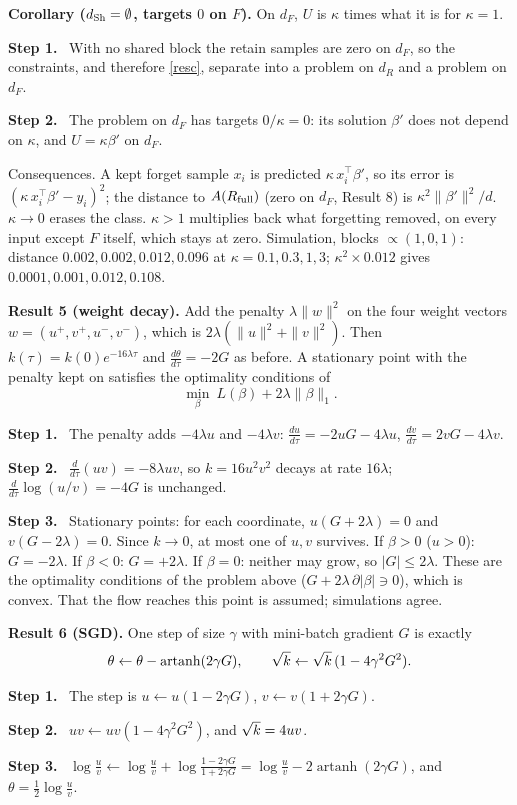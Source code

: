 \documentclass[10pt]{article}
\newcommand{\Rf}{R_{\rm full}}\newcommand{\Ff}{F_{\rm full}}\newcommand{\dSh}{d_{\rm Sh}}
\newcommand{\step}[1]{\par\smallskip\textbf{Step #1.}\ }
\begin{document}
\textbf{Corollary ($\dSh=\emptyset$, targets $0$ on $F$).} On $d_F$, $U$ is $\kappa$ times what it is for $\kappa=1$.
\step1 With no shared block the retain samples are zero on $d_F$, so the constraints, and therefore \eqref{resc}, separate into a problem on $d_R$ and a problem on $d_F$.
\step2 The problem on $d_F$ has targets $0/\kappa=0$: its solution $\beta'$ does not depend on $\kappa$, and $U=\kappa\beta'$ on $d_F$.

Consequences. A kept forget sample $x_i$ is predicted $\kappa\,x_i^\top\beta'$, so its error is $(\kappa\,x_i^\top\beta'-y_i)^2$; the distance to $A(\Rf)$ (zero on $d_F$, Result 8) is $\kappa^2\|\beta'\|^2/d$. $\kappa\to0$ erases the class. $\kappa>1$ multiplies back what forgetting removed, on every input except $F$ itself, which stays at zero. Simulation, blocks $\propto(1,0,1)$: distance $0.002,0.002,0.012,0.096$ at $\kappa=0.1,0.3,1,3$; $\kappa^2\times0.012$ gives $0.0001,0.001,0.012,0.108$.

\textbf{Result 5 (weight decay).} Add the penalty $\lambda\|w\|^2$ on the four weight vectors $w=(u^+,v^+,u^-,v^-)$, which is $2\lambda(\|u\|^2+\|v\|^2)$. Then $k(\tau)=k(0)e^{-16\lambda\tau}$ and $\frac{d\theta}{d\tau}=-2G$ as before. A stationary point with the penalty kept on satisfies the optimality conditions of
\[
\min_\beta\ L(\beta)+2\lambda\|\beta\|_1 .
\]
\step1 The penalty adds $-4\lambda u$ and $-4\lambda v$: $\frac{du}{d\tau}=-2uG-4\lambda u$, $\frac{dv}{d\tau}=2vG-4\lambda v$.
\step2 $\frac d{d\tau}(uv)=-8\lambda uv$, so $k=16u^2v^2$ decays at rate $16\lambda$; $\frac d{d\tau}\log(u/v)=-4G$ is unchanged.
\step3 Stationary points: for each coordinate, $u(G+2\lambda)=0$ and $v(G-2\lambda)=0$. Since $k\to0$, at most one of $u,v$ survives. If $\beta>0$ ($u>0$): $G=-2\lambda$. If $\beta<0$: $G=+2\lambda$. If $\beta=0$: neither may grow, so $|G|\le2\lambda$. These are the optimality conditions of the problem above ($G+2\lambda\,\partial|\beta|\ni0$), which is convex. That the flow reaches this point is assumed; simulations agree.

\textbf{Result 6 (SGD).} One step of size $\gamma$ with mini-batch gradient $G$ is exactly
\[
\theta\leftarrow\theta-\operatorname{artanh}(2\gamma G),\qquad \sqrt k\leftarrow\sqrt k\,(1-4\gamma^2G^2).
\]
\step1 The step is $u\leftarrow u(1-2\gamma G)$, $v\leftarrow v(1+2\gamma G)$.
\step2 $uv\leftarrow uv(1-4\gamma^2G^2)$, and $\sqrt k=4uv$.
\step3 $\log\frac uv\leftarrow\log\frac uv+\log\frac{1-2\gamma G}{1+2\gamma G}=\log\frac uv-2\operatorname{artanh}(2\gamma G)$, and $\theta=\frac12\log\frac uv$.
\end{document}
